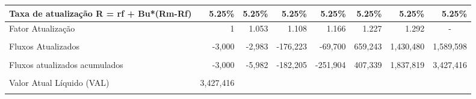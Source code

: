 \documentclass[11pt]{article}
\begin{document}
\begin{adjustbox}{center}
\begin{tabular}{lrrrrrrr}
			\multicolumn{1}{|l|}{Taxa de atualização R = rf + Bu*(Rm-Rf)} & \multicolumn{1}{r|}{5.25\%}    & \multicolumn{1}{r|}{5.25\%}    & \multicolumn{1}{r|}{5.25\%}   & \multicolumn{1}{r|}{5.25\%}    & \multicolumn{1}{r|}{5.25\%}  & \multicolumn{1}{r|}{5.25\%}    & \multicolumn{1}{r|}{5.25\%}    \\ \hline
			\multicolumn{1}{|l|}{Fator Atualização}                       & \multicolumn{1}{r|}{1}         & \multicolumn{1}{r|}{1.053}     & \multicolumn{1}{r|}{1.108}    & \multicolumn{1}{r|}{1.166}     & \multicolumn{1}{r|}{1.227}   & \multicolumn{1}{r|}{1.292}     & \multicolumn{1}{c|}{-}         \\ \hline
			&                                &                                &                               &                                &                              &                                &                                \\ \hline
			\multicolumn{1}{|l|}{Fluxos Atualizados}                      & \multicolumn{1}{r|}{-3,000}    & \multicolumn{1}{r|}{-2,983}     & \multicolumn{1}{r|}{-176,223} & \multicolumn{1}{r|}{-69,700}   & \multicolumn{1}{r|}{659,243} & \multicolumn{1}{r|}{1,430,480} & \multicolumn{1}{r|}{1,589,598} \\ \hline
			&                                &                                &                               &                                &                              &                                &                                \\ \hline
			\multicolumn{1}{|l|}{Fluxos atualizados acumulados}           & \multicolumn{1}{r|}{-3,000}    & \multicolumn{1}{r|}{-5,982}     & \multicolumn{1}{r|}{-182,205} & \multicolumn{1}{r|}{-251,904}  & \multicolumn{1}{r|}{407,339} & \multicolumn{1}{r|}{1,837,819} & \multicolumn{1}{r|}{3,427,416} \\ \hline
			&                                &                                &                               &                                &                              &                                &                                \\ \cline{1-2}
			\multicolumn{1}{|l|}{Valor Atual Líquido (VAL)}               & \multicolumn{1}{r|}{3,427,416} &                                &                               &                                &                              &                                &                                \\ \cline{1-2}
			&                                &                                &                               &                                &                              &                                &                                \\ \cline{1-2}

\end{tabular}
\end{adjustbox}
\end{document}
